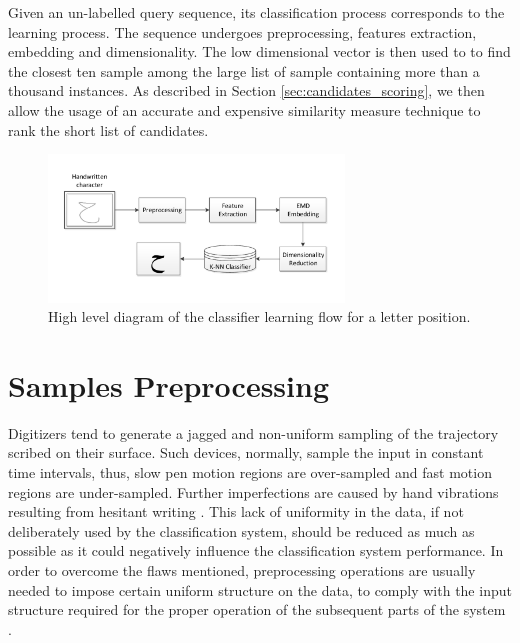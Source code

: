 \iftoggle{edit-mode}{\hspace{0pt}\marginpar{The recognition process}}{}
Given an un-labelled query sequence, its classification process corresponds to the learning process.
The sequence undergoes preprocessing, features extraction, embedding and dimensionality.
The low dimensional vector is then used to to find the closest ten sample among the large list of sample containing more than a thousand instances.  
As described in Section \ref{sec:candidates_scoring}, we then allow the usage of an accurate and expensive similarity measure technique to rank the short list of candidates. 

\begin{figure}
\centering
\includegraphics[width=0.7\textwidth]{./figures/letters_classifier_learning_flow}       
\caption{High level diagram of the classifier learning flow for a letter position.}
\label{fig:letters_classifier_learning_flow}
\end{figure}


\newpage{}

\section{Samples Preprocessing}
\label{sec:preprocessing}

\iftoggle{edit-mode}{\hspace{0pt}\marginpar{Introduction}}{}
Digitizers tend to generate a jagged and non-uniform sampling of the trajectory scribed on their surface.
Such devices, normally, sample the input in constant time intervals, thus, slow pen motion regions are over-sampled and fast motion regions are under-sampled.
Further imperfections are caused by hand vibrations resulting from hesitant writing \cite{huang2009preprocessing}.
This lack of uniformity in the data, if not deliberately used by the classification system, should be reduced as much as possible as it could negatively influence the classification system performance.
In order to overcome the flaws mentioned, preprocessing operations are usually needed to impose certain uniform structure on the data, to comply with the input structure required for the proper operation of the subsequent parts of the system \cite{al2011online}.


